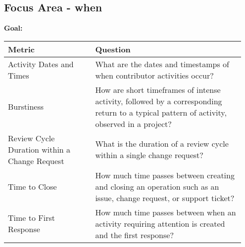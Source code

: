 
\subsection{Focus Area - when}
\textbf{Goal:} 
\begin{table}[ht!]
    \centering
    \begin{tabular}{|p{0.35\linewidth} | p{0.6\linewidth}|}
        \hline
        \hfil \textbf{Metric}  & \hfil \textbf{Question} \\
        \hline
		Activity Dates and Times & What are the dates and timestamps of when contributor activities occur? \\ 
		\hline
		Burstiness & How are short timeframes of intense activity, followed by a corresponding return to a typical pattern of activity, observed in a project? \\ 
		\hline
		Review Cycle Duration within a Change Request & What is the duration of a review cycle within a single change request? \\ 
		\hline
		Time to Close & How much time passes between creating and closing an operation such as an issue, change request, or support ticket? \\ 
		\hline
		Time to First Response & How much time passes between when an activity requiring attention is created and the first response? \\ 
		\hline
    \end{tabular}
\end{table}
